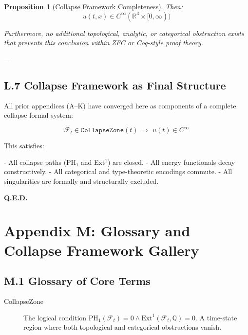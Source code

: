 \documentclass[11pt]{article}
\newtheorem{proposition}[theorem]{Proposition}
\begin{document}
{{{\begin{proposition}[Collapse Framework Completeness]
Then:
\[
u(t,x) \in C^\infty(\mathbb{R}^3 \times [0,\infty))
\]

Furthermore, no additional topological, analytic, or categorical obstruction exists  
that prevents this conclusion within ZFC or Coq-style proof theory.
\end{proposition}

---

\subsection*{L.7 Collapse Framework as Final Structure}

All prior appendices (A–K) have converged here as components of a complete collapse formal system:

\[
\boxed{
\mathcal{F}_t \in \texttt{CollapseZone}(t)
\;\Longrightarrow\;
u(t) \in C^\infty
}
\]

This satisfies:

- All collapse paths (PH₁ and Ext$^1$) are closed.
- All energy functionals decay constructively.
- All categorical and type-theoretic encodings commute.
- All singularities are formally and structurally excluded.

\begin{flushright}
\textbf{Q.E.D.}
\end{flushright}




\section*{Appendix M: Glossary and Collapse Framework Gallery}

\subsection*{M.1 Glossary of Core Terms}

\begin{description}

  \item[CollapseZone]  
  The logical condition \( \mathrm{PH}_1(\mathcal{F}_t) = 0 \land \mathrm{Ext}^1(\mathcal{F}_t, \mathbb{Q}) = 0 \).  
  A time-state region where both topological and categorical obstructions vanish.


\end{description}}}}
\end{document}
